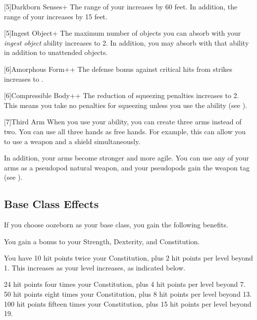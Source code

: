     [5]{Darkborn Senses+} The range of your  increases by 60 feet.
      In addition, the range of your  increases by 15 feet.

    [5]{Ingest Object+} The maximum number of objects you can absorb with your \textit{ingest object} ability increases to 2.
      In addition, you may absorb  with that ability in addition to unattended objects.

    [6]{Amorphous Form++} The defense bonus against critical hits from strikes increases to .

    [6]{Compressible Body++} The reduction of squeezing penalties increases to 2.
      This means you take no penalties for squeezing unless you use the  ability (see ).

    [7]{Third Arm} When you use your  ability, you can create three arms instead of two.
      You can use all three hands as free hands.
      For example, this can allow you to use a  weapon and a shield simultaneously.

      In addition, your arms become stronger and more agile.
      You can use any of your arms as a pseudopod natural weapon, and your pseudopods gain the  weapon tag (see ).

  \subsection{Base Class Effects}
    If you choose oozeborn as your base class, you gain the following benefits.

      You gain a  bonus to your Strength, Dexterity, and Constitution.

      You have 10 hit points \add twice your Constitution, plus 2 hit points per level beyond 1.
      This increases as your level increases, as indicated below.
      \begin{itemize}
         24 hit points \add four times your Constitution, plus 4 hit points per level beyond 7.
         50 hit points \add eight times your Constitution, plus 8 hit points per level beyond 13.
         100 hit points \add fifteen times your Constitution, plus 15 hit points per level beyond 19.
      \end{itemize}

